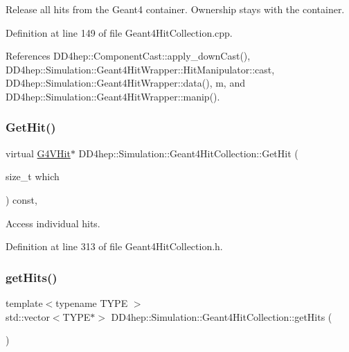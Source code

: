 Release all hits from the Geant4 container. Ownership stays with the container. 



Definition at line 149 of file Geant4\+Hit\+Collection.\+cpp.



References D\+D4hep\+::\+Component\+Cast\+::apply\+\_\+down\+Cast(), D\+D4hep\+::\+Simulation\+::\+Geant4\+Hit\+Wrapper\+::\+Hit\+Manipulator\+::cast, D\+D4hep\+::\+Simulation\+::\+Geant4\+Hit\+Wrapper\+::data(), m, and D\+D4hep\+::\+Simulation\+::\+Geant4\+Hit\+Wrapper\+::manip().

\hypertarget{class_d_d4hep_1_1_simulation_1_1_geant4_hit_collection_a5d2a282043b247ee47e891a47637a006}{}\label{class_d_d4hep_1_1_simulation_1_1_geant4_hit_collection_a5d2a282043b247ee47e891a47637a006} 
\subsubsection{\texorpdfstring{Get\+Hit()}{GetHit()}}
{\footnotesize\ttfamily virtual \hyperlink{class_g4_v_hit}{G4\+V\+Hit}$\ast$ D\+D4hep\+::\+Simulation\+::\+Geant4\+Hit\+Collection\+::\+Get\+Hit (\begin{DoxyParamCaption}\item[{size\+\_\+t}]{which }\end{DoxyParamCaption}) const\hspace{0.3cm}{\ttfamily [inline]}, {\ttfamily [virtual]}}



Access individual hits. 



Definition at line 313 of file Geant4\+Hit\+Collection.\+h.

\hypertarget{class_d_d4hep_1_1_simulation_1_1_geant4_hit_collection_ae0023e68cc7074adb4cf960696881d42}{}\label{class_d_d4hep_1_1_simulation_1_1_geant4_hit_collection_ae0023e68cc7074adb4cf960696881d42} 
\subsubsection{\texorpdfstring{get\+Hits()}{getHits()}}
{\footnotesize\ttfamily template$<$typename T\+Y\+PE $>$ \\
std\+::vector$<$T\+Y\+PE$\ast$$>$ D\+D4hep\+::\+Simulation\+::\+Geant4\+Hit\+Collection\+::get\+Hits (\begin{DoxyParamCaption}{ }\end{DoxyParamCaption})\hspace{0.3cm}{\ttfamily [inline]}}



